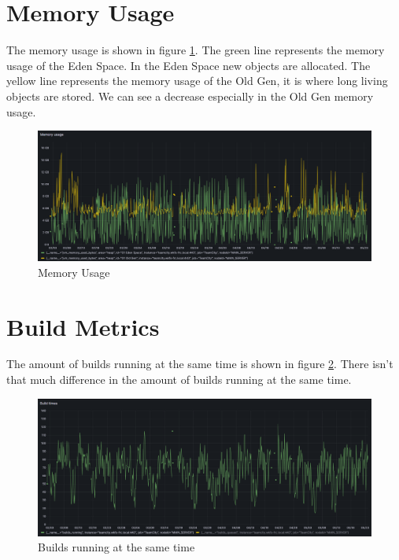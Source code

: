 \section{Memory Usage}%
\label{sec:memory-usage}

The memory usage is shown in figure \ref{fig:memory}. The green line represents the memory usage of the Eden Space. In the Eden Space new objects are allocated. The yellow line represents the memory usage of the Old Gen, it is where long living objects are stored. We can see a decrease especially in the Old Gen memory usage. 

\begin{figure}[htbp]
    \centering
    \includegraphics[width=\textwidth]{graphics/memory.png}
    \caption{Memory Usage}
    \label{fig:memory}
\end{figure}

\section{Build Metrics}%
\label{sec:build-metrics}

The amount of builds running at the same time is shown in figure \ref{fig:builds-running}. There isn't that much difference in the amount of builds running at the same time.

\begin{figure}[htbp]
    \centering
    \includegraphics[width=\textwidth]{graphics/builds running.png}
    \caption{Builds running at the same time}
    \label{fig:builds-running}
\end{figure}

